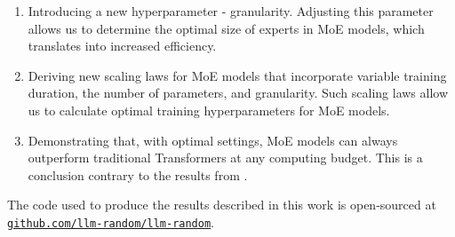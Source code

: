 \begin{enumerate}
    \item Introducing a new hyperparameter - granularity. Adjusting this parameter allows us to determine the optimal size of experts in MoE models, which translates into increased efficiency.

    \item Deriving new scaling laws for MoE models that incorporate variable training duration, the number of parameters, and granularity. Such scaling laws allow us to calculate optimal training hyperparameters for MoE models.
    



\item Demonstrating that, with optimal settings, MoE models can always outperform traditional Transformers at any computing budget. This is a conclusion contrary to the results from \cite{clark2022unified}.
\end{enumerate}

The code used to produce the results described in this work is open-sourced at \href{https://github.com/llm-random/llm-random}{\texttt{github.com/llm-random/llm-random}}.